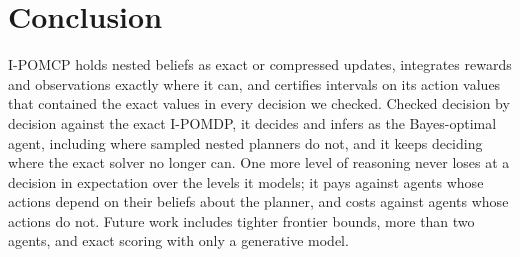 \documentclass{article}
\begin{document}
\section{Conclusion}
\label{sec:conclusion}

I-POMCP holds nested beliefs as exact or compressed updates, integrates rewards and observations exactly where it can, and certifies intervals on its action values that contained the exact values in every decision we checked. Checked decision by decision against the exact I-POMDP, it decides and infers as the Bayes-optimal agent, including where sampled nested planners do not, and it keeps deciding where the exact solver no longer can. One more level of reasoning never loses at a decision in expectation over the levels it models; it pays against agents whose actions depend on their beliefs about the planner, and costs against agents whose actions do not. Future work includes tighter frontier bounds, more than two agents, and exact scoring with only a generative model.



\end{document}
